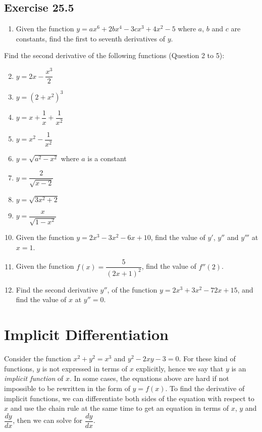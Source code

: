 \documentclass[12pt]{report}
\begin{document}
\subsection{Exercise 25.5}
\setlength{\columnseprule}{1pt}
\setlength{\columnsep}{24pt}
\begin{multicols}{2}
    \begin{enumerate}
        \item Given the function $y=a x^{6}+2b x^{4}-3c x^{3}+4x^{2}-5$ where $a$, $b$ and
              $c$ are constants, find the first to seventh derivatives of $y$.
    \end{enumerate}
    \noindent Find the second derivative of the following functions (Question 2 to 5):
    \begin{enumerate}
        \setcounter{enumi}{1}
        \item $y=2x-{\dfrac{x^{3}}{2}}$
        \item $y={\left(2+x^{2}\right)}^{3}$
        \item $y=x+{\dfrac{1}{x}}+{\dfrac{1}{x^{2}}}$
        \item $y=x^{2}-{\dfrac{1}{x^{2}}}$
        \item $y={\sqrt{a^{2}-x^{2}}}$ where $a$ is a constant
        \item $y={\dfrac{2}{\sqrt{x-2}}}$
        \item $y={\sqrt{3x^{2}+2}}$
        \item $y={\dfrac{x}{\sqrt{1-x^{2}}}}$
        \item Given the function $y = 2x^3 - 3x^2 - 6x + 10$, find the value of $y'$, $y''$
              and $y'''$ at $x = 1$.
        \item Given the function $f (x) = \dfrac{5}{{(2x + 1)}^2}$, find the value of $f''
                  (2)$.
        \item Find the second derivative $y''$, of the function $y = 2x^3 + 3x^2 - 72x + 15$,
              and find the value of $x$ at $y'' = 0$.
    \end{enumerate}
\end{multicols}

\section{Implicit Differentiation}

Consider the function $x^2 + y^2 = x^3$ and $y^2 - 2xy - 3 = 0$. For these kind
of functions, $y$ is not expressed in terms of $x$ explicitly, hence we say
that $y$ is an \textit{implicit function} of $x$. In some cases, the equations
above are hard if not impossible to be rewritten in the form of $y = f (x)$. To
find the derivative of implicit functions, we can differentiate both sides of
the equation with respect to $x$ and use the chain rule at the same time to get
an equation in terms of $x$, $y$ and $\dfrac{dy}{dx}$, then we can solve for
$\dfrac{dy}{dx}$.
\end{document}
